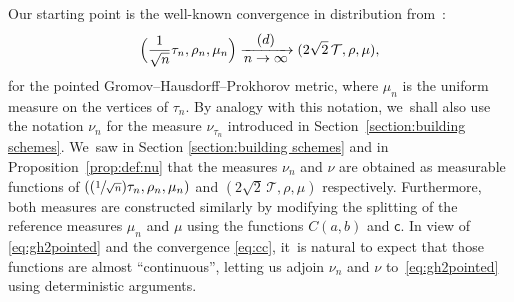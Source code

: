 \documentclass[11pt]{article}
\newcommand{\Psfrac}[2]{(\sfrac{#1}{#2})}
\newcommand{\T}{\mathcal{T}}\let\CRT\T\let\tbr\T
\theoremstyle{definition}
\begin{document}
Our starting point is the well-known convergence in distribution from~\cite{Ald93}:
\begin{equation}\label{eq:gh2pointed} \Bigl(\frac{1}{\sqrt{n}}\tau_n,\rho_n,\mu_n \Bigr) \xrightarrow[\textstyle n\to\infty]{\textstyle(d)} (2\sqrt{2}\,\T,\rho,\mu),
\end{equation}
for the pointed Gromov--Hausdorff--Prokhorov metric, where $\mu_n$ is the uniform measure on the vertices of $\tau_n$. By analogy with this notation, we~shall also use the notation $\nu_n$ for the measure $\nu_{\tau_n}$ introduced in Section~\ref{section:building schemes}. We~saw in Section \ref{section:building schemes} and in Proposition~\ref{prop:def:nu} that the measures $\nu_n$ and $\nu$ are obtained as measurable functions of $(\Psfrac{1}{\sqrt{n}}\tau_n,\rho_n,\mu_n)$ and $(2\sqrt{2}\,\T,\rho,\mu)$ respectively. Furthermore, both measures are constructed similarly by modifying the splitting of the reference measures $\mu_n$ and $\mu$ using the functions $C(a,b)$ and $ \mathsf{c}$. In view of \eqref{eq:gh2pointed} and the convergence \eqref{eq:cc}, it~is natural to expect that those functions are almost ``continuous'', letting us adjoin $\nu_n$ and $\nu$ to~\eqref{eq:gh2pointed} using deterministic arguments.
\end{document}
